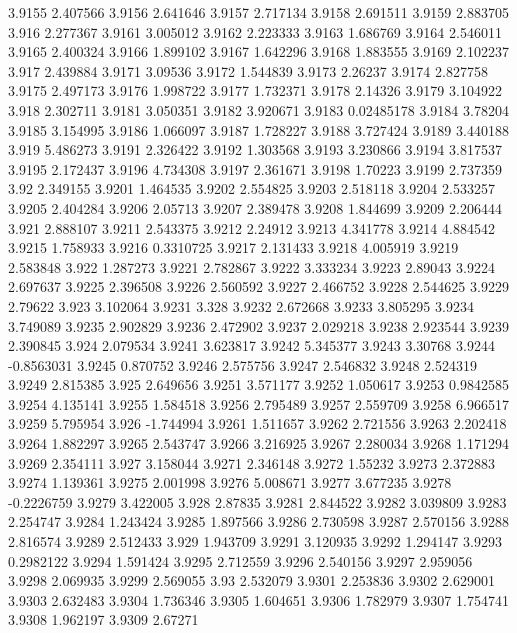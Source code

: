 3.9155  2.407566
3.9156  2.641646
3.9157  2.717134
3.9158  2.691511
3.9159  2.883705
3.916  2.277367
3.9161  3.005012
3.9162  2.223333
3.9163  1.686769
3.9164  2.546011
3.9165  2.400324
3.9166  1.899102
3.9167  1.642296
3.9168  1.883555
3.9169  2.102237
3.917  2.439884
3.9171  3.09536
3.9172  1.544839
3.9173  2.26237
3.9174  2.827758
3.9175  2.497173
3.9176  1.998722
3.9177  1.732371
3.9178  2.14326
3.9179  3.104922
3.918  2.302711
3.9181  3.050351
3.9182  3.920671
3.9183  0.02485178
3.9184  3.78204
3.9185  3.154995
3.9186  1.066097
3.9187  1.728227
3.9188  3.727424
3.9189  3.440188
3.919  5.486273
3.9191  2.326422
3.9192  1.303568
3.9193  3.230866
3.9194  3.817537
3.9195  2.172437
3.9196  4.734308
3.9197  2.361671
3.9198  1.70223
3.9199  2.737359
3.92  2.349155
3.9201  1.464535
3.9202  2.554825
3.9203  2.518118
3.9204  2.533257
3.9205  2.404284
3.9206  2.05713
3.9207  2.389478
3.9208  1.844699
3.9209  2.206444
3.921  2.888107
3.9211  2.543375
3.9212  2.24912
3.9213  4.341778
3.9214  4.884542
3.9215  1.758933
3.9216  0.3310725
3.9217  2.131433
3.9218  4.005919
3.9219  2.583848
3.922  1.287273
3.9221  2.782867
3.9222  3.333234
3.9223  2.89043
3.9224  2.697637
3.9225  2.396508
3.9226  2.560592
3.9227  2.466752
3.9228  2.544625
3.9229  2.79622
3.923  3.102064
3.9231  3.328
3.9232  2.672668
3.9233  3.805295
3.9234  3.749089
3.9235  2.902829
3.9236  2.472902
3.9237  2.029218
3.9238  2.923544
3.9239  2.390845
3.924  2.079534
3.9241  3.623817
3.9242  5.345377
3.9243  3.30768
3.9244  -0.8563031
3.9245  0.870752
3.9246  2.575756
3.9247  2.546832
3.9248  2.524319
3.9249  2.815385
3.925  2.649656
3.9251  3.571177
3.9252  1.050617
3.9253  0.9842585
3.9254  4.135141
3.9255  1.584518
3.9256  2.795489
3.9257  2.559709
3.9258  6.966517
3.9259  5.795954
3.926  -1.744994
3.9261  1.511657
3.9262  2.721556
3.9263  2.202418
3.9264  1.882297
3.9265  2.543747
3.9266  3.216925
3.9267  2.280034
3.9268  1.171294
3.9269  2.354111
3.927  3.158044
3.9271  2.346148
3.9272  1.55232
3.9273  2.372883
3.9274  1.139361
3.9275  2.001998
3.9276  5.008671
3.9277  3.677235
3.9278  -0.2226759
3.9279  3.422005
3.928  2.87835
3.9281  2.844522
3.9282  3.039809
3.9283  2.254747
3.9284  1.243424
3.9285  1.897566
3.9286  2.730598
3.9287  2.570156
3.9288  2.816574
3.9289  2.512433
3.929  1.943709
3.9291  3.120935
3.9292  1.294147
3.9293  0.2982122
3.9294  1.591424
3.9295  2.712559
3.9296  2.540156
3.9297  2.959056
3.9298  2.069935
3.9299  2.569055
3.93  2.532079
3.9301  2.253836
3.9302  2.629001
3.9303  2.632483
3.9304  1.736346
3.9305  1.604651
3.9306  1.782979
3.9307  1.754741
3.9308  1.962197
3.9309  2.67271
